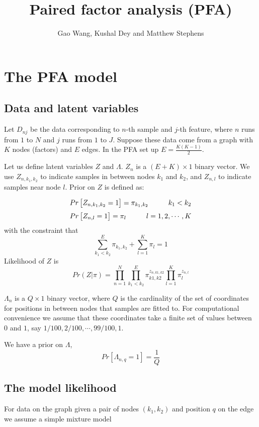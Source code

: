 \documentclass[11pt,authoryear]{article}
\begin{document}
\singlespacing
\title{Paired factor analysis (PFA)}
\author{Gao Wang, Kushal Dey and Matthew Stephens}
\maketitle

\section{The PFA model}

\subsection{Data and latent variables}
Let $D_{nj}$ be the data corresponding to $n$-th sample and $j$-th feature, 
where $n$ runs from $1$ to $N$ and $j$ runs from $1$ to $J$.  
Suppose these data come from a graph with $K$ nodes (factors) and $E$ edges. In the
PFA set up $E=\frac{K(K-1)}{2}$.

Let us define latent variables $Z$ and $\Lambda$. $Z_{n}$ is a $(E+K)
\times 1$ binary vector. We use $Z_{n,k_1,k_2}$ to indicate samples in between
nodes $k_1$ and $k_2$, and $Z_{n,l}$ to indicate samples near node $l$. Prior
on $Z$ is defined as:

$$ Pr \left [ Z_{n, k_1, k_2} = 1 \right ] = \pi_{k_1,k_2} \hspace{1 cm} k_1 < k_2$$
$$ Pr \left [ Z_{n, l} = 1 \right ] = \pi_{l} \hspace{1 cm} l=1,2, \cdots, K$$
with the constraint that
$$ \sum_{k_1 < k_2}^E \pi_{k_1, k_2} + \sum_{l=1}^{K} \pi_{l} = 1 $$
Likelihood of $Z$ is
$$  Pr (Z |  \pi )  = \prod_{n=1}^{N} \prod_{k_1 < k_2}^E \pi_{k1,k2}^{z_{n,k1,k2}} \prod_{l=1}^{K} \pi_{l}^{z_{n,l}} $$

$\Lambda_{n}$ is a $Q \times 1$ binary vector, where $Q$ is the cardinality of
the set of coordinates for positions in between nodes that samples are fitted
to. For computational convenience we assume that these coordinates take a finite 
set of values between $0$ and $1$, say $1/100, 2/100, \cdots, 99/100, 1$.

We have a prior on  $\Lambda$,
$$ Pr \left [ \Lambda_{n, q} = 1 \right ] = \frac{1}{Q} $$


\subsection{The model likelihood}
For data on the graph given a pair of nodes $(k_1, k_2)$ and position $q$ on the
edge we assume a simple mixture model 
\end{document}
